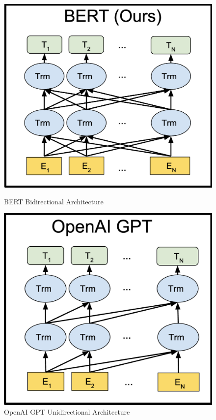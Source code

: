 \begin{figure}[h]
    \centering
    \begin{minipage}[b]{0.40\textwidth}
        \centering
        \includegraphics[width=\textwidth]{figures/bert.png}
        \caption{BERT Bidirectional Architecture}
        \label{fig:bert}
    \end{minipage}
    \hfill
    \begin{minipage}[b]{0.39\textwidth}
        \centering
        \includegraphics[width=\textwidth]{figures/openai.png}
        \caption{OpenAI GPT Unidirectional Architecture}
        \label{fig:gpt}
    \end{minipage}
\end{figure}

